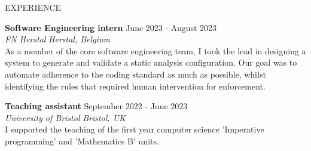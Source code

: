 \documentclass{resume} %
\begin{document}
\begin{rSection}{EXPERIENCE}

\textbf{Software Engineering intern} \hfill June 2023 - August 2023\\
\textit{FN Herstal} \hfill \textit{Herstal, Belgium} \\
As a member of the core software engineering team, I took the lead in designing a system to generate and validate a static analysis configuration. Our goal was to automate adherence to the coding standard as much as possible, whilst identifying the rules that required human intervention for enforcement.

\textbf{Teaching assistant} \hfill September 2022 - June 2023\\
\textit{University of Bristol} \hfill \textit{Bristol, UK} \\
I supported the teaching of the first year computer science 'Imperative programming' and 'Mathematics B' units.
 
\end{rSection} 

\end{document}
